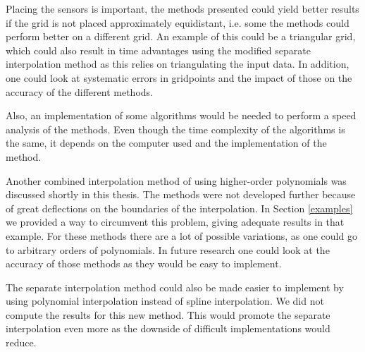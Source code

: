 Placing the sensors is important, the methods presented could yield better results if the grid is not placed approximately equidistant, i.e. some the methods could perform better on a different grid. An example of this could be a triangular grid, which could also result in time advantages using the modified separate interpolation method as this relies on triangulating the input data. In addition, one could look at systematic errors in gridpoints and the impact of those on the accuracy of the different methods.

Also, an implementation of some algorithms would be needed to perform a speed analysis of the methods.
Even though the time complexity of the algorithms is the same, it depends on the computer used and the implementation of the method.

Another combined interpolation method of using higher-order polynomials was discussed shortly in this thesis.
The methods were not developed further because of great deflections on the boundaries of the interpolation.
In Section \ref{examples} we provided a way to circumvent this problem, giving adequate results in that example.
For these methods there are a lot of possible variations, as one could go to arbitrary orders of polynomials.
In future research one could look at the accuracy of those methods as they would be easy to implement.

The separate interpolation method could also be made easier to implement by using polynomial interpolation instead of spline interpolation.
We did not compute the results for this new method.
This would promote the separate interpolation even more as the downside of difficult implementations would reduce.
